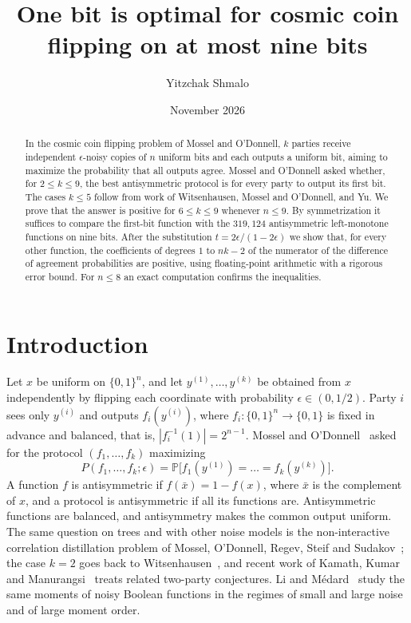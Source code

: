 \documentclass[11pt]{amsart}
\title[Cosmic coin flipping on at most nine bits]{One bit is optimal for cosmic coin flipping on at most nine
bits}
\author{Yitzchak Shmalo}
\date{November 2026}
\theoremstyle{remark}
\newcommand{\Prob}{\mathbb{P}}
\begin{document}
\begin{abstract}
In the cosmic coin flipping problem of Mossel and O'Donnell, $k$ parties receive independent $\epsilon$-noisy copies of
$n$ uniform bits and each outputs a uniform bit, aiming to maximize the probability that all outputs agree. Mossel and
O'Donnell asked whether, for $2\le k\le 9$, the best antisymmetric protocol is for every party to output its first
bit. The cases $k\le5$ follow from work of Witsenhausen, Mossel and O'Donnell, and Yu. We prove that the answer is
positive for $6\le k\le 9$ whenever $n\le 9$. By symmetrization it suffices to compare the first-bit function with the
$319{,}124$ antisymmetric left-monotone functions on nine bits. After the substitution $t=2\epsilon/(1-2\epsilon)$ we
show that, for every other function, the coefficients of degrees $1$ to $nk-2$ of the numerator of the difference of
agreement probabilities are positive, using floating-point arithmetic with a rigorous error bound. For $n\le8$ an
exact computation confirms the inequalities.
\end{abstract}
\maketitle

\section{Introduction}

Let $x$ be uniform on $\{0,1\}^n$, and let $y^{(1)},\dots,y^{(k)}$ be obtained from $x$ independently by flipping each
coordinate with probability $\epsilon\in(0,1/2)$. Party $i$ sees only $y^{(i)}$ and outputs $f_i(y^{(i)})$, where
$f_i\colon\{0,1\}^n\to\{0,1\}$ is fixed in advance and balanced, that is, $|f_i^{-1}(1)|=2^{n-1}$. Mossel and
O'Donnell~\cite{MO05} asked for the protocol $(f_1,\dots,f_k)$ maximizing
\[
  P(f_1,\dots,f_k;\epsilon)=\Prob\bigl[f_1(y^{(1)})=\dots=f_k(y^{(k)})\bigr].
\]
A function $f$ is antisymmetric if $f(\bar x)=1-f(x)$, where $\bar x$ is the complement of $x$, and a protocol is
antisymmetric if all its functions are. Antisymmetric functions are balanced, and antisymmetry makes the common output
uniform. The same question on trees and with other noise models is the non-interactive correlation distillation
problem of Mossel, O'Donnell, Regev, Steif and Sudakov~\cite{MORSS06}; the case $k=2$ goes back to
Witsenhausen~\cite{W75}, and recent work of Kamath, Kumar and Manurangsi~\cite{KKM26} treats related two-party
conjectures. Li and M\'edard~\cite{LM21} study the same moments of noisy Boolean functions in the regimes of small
and large noise and of large moment order.
\end{document}
